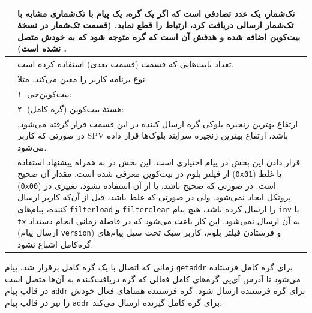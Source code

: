 \begin{xltabular}{\textwidth}{|c|X|}
	\hline
	 & {
		تک‌شمار، یک عدد تصادفی است که اگر یک گره،‌ یک پیام با تک‌شماری مشابه با تک‌شمار ارسالی دریافت کرد، ارتباط را قطع نماید. (قسمت تک‌شمار در نسخهٔ  بیت‌کوین اضافه شده و هدفش آن است که گره متوجه شود که به خودش متصل نشده است)
		.
	}\\
	\hline
	 & {
		تعداد بایت‌هایی که قسمت  (قسمت بعدی) استفاده کرده است.
	}\\
	
	\hline
	 & {
		نوع برنامه کاربر را معین می‌کند. مثلا:
	}\\
	
	&  {%
		۱. بیت‌کوین‌جی: 
		} \\
	&  {%
		۲. هستهٔ بیت‌کوین (گره کامل): 
		} \\
	
	\hline
	 & {
		ارتفاع بهترین زنجیره‌ بلوکی گره ارسال کننده در این قسمت قرار گرفته می‌شود. در صورتی که کاربر SPV باشد، ارتفاع بهترین زنجیره سرایند بلوک‌‌ها قرار داده می‌شود.
	}\\
	
	\hline
	 & {
		قرار دادن این بخش در پیام اختیاری است. این بخش در \cite{Hearn2013} به همراه پیشنهاد استفاده از فیلتر بلوم در بیت‌کوین معرفی شده است. مقدار آن صحیح (\texttt{0x01}) یا غلط (\texttt{0x00}) است. در صورتی که صحیح باشد، یا از آن استفاده نشود، تغییری در پروتکل ایجاد نمی‌شود. ولی در صورتی که غلط باشد، قبل از آن‌که کاربر ارسال کننده، پیام‌های \texttt{filterload} و \texttt{filterclear} را ارسال کرده باشد، هیچ پیام \texttt{inv} یا \texttt{tx} به آن ارسال نمی‌شود. این کار باعث می‌شود که در فاصلهٔ زمانی انجام 
		دستداد 
		(ارسال پیام \texttt{version}) و فرستادن فیلتر بلوم، کاربر سبک تحت سیل پیام‌های گره‌کامل اشباع نشود. 
	}\\
	
	
	\hline
\end{xltabular}

زمانی که اتصال با یک گره کامل برقرار شد، پیام \texttt{getaddr} برای گره کامل فرستاده می‌شود تا آدرس آی‌پی گره‌های کامل فعالی که گره دریافت‌کننده به آن‌ها متصل است در قالب پیام \texttt{addr} برای گره فرستنده ارسال شود. گره فرستنده همتا‌های فعال خودش را نیز در قالب پیام \texttt{addr} برای گره کامل گیرنده ارسال می‌کند.

